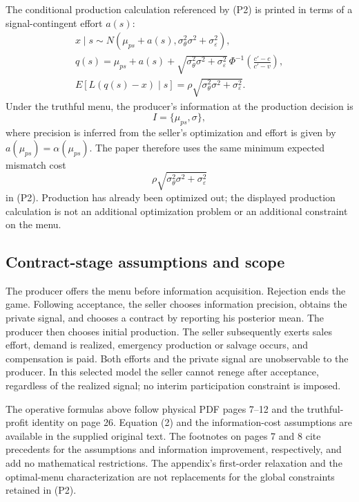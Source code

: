 \documentclass{article}
\begin{document}
The conditional production calculation referenced by (P2) is printed in terms of a signal-contingent effort $a(s)$:
\begin{gather*}
x\mid s\sim N\!\left(\mu_{ps}+a(s),
\sigma_\theta^2\sigma^2+\sigma_\varepsilon^2\right),\\
q(s)=\mu_{ps}+a(s)
+\sqrt{\sigma_\theta^2\sigma^2+\sigma_\varepsilon^2}
\,\Phi^{-1}\!\left(\frac{c'-c}{c'-v}\right),\\
E[L(q(s)-x)\mid s]
=\rho\sqrt{\sigma_\theta^2\sigma^2+\sigma_\varepsilon^2}.
\end{gather*}
Under the truthful menu, the producer's information at the production decision is
\begin{equation*}
I=\{\mu_{ps},\sigma\},
\end{equation*}
where precision is inferred from the seller's optimization and effort is given by $a(\mu_{ps})=\alpha(\mu_{ps})$. The paper therefore uses the same minimum expected mismatch cost
\begin{equation*}
\rho\sqrt{\sigma_\theta^2\sigma^2+\sigma_\varepsilon^2}
\end{equation*}
in (P2). Production has already been optimized out; the displayed production calculation is not an additional optimization problem or an additional constraint on the menu.

\subsection*{Contract-stage assumptions and scope}

The producer offers the menu before information acquisition. Rejection ends the game. Following acceptance, the seller chooses information precision, obtains the private signal, and chooses a contract by reporting his posterior mean. The producer then chooses initial production. The seller subsequently exerts sales effort, demand is realized, emergency production or salvage occurs, and compensation is paid. Both efforts and the private signal are unobservable to the producer. In this selected model the seller cannot renege after acceptance, regardless of the realized signal; no interim participation constraint is imposed.

The operative formulas above follow physical PDF pages 7--12 and the truthful-profit identity on page 26. Equation (2) and the information-cost assumptions are available in the supplied original text. The footnotes on pages 7 and 8 cite precedents for the assumptions and information improvement, respectively, and add no mathematical restrictions. The appendix's first-order relaxation and the optimal-menu characterization are not replacements for the global constraints retained in (P2).
\end{document}
